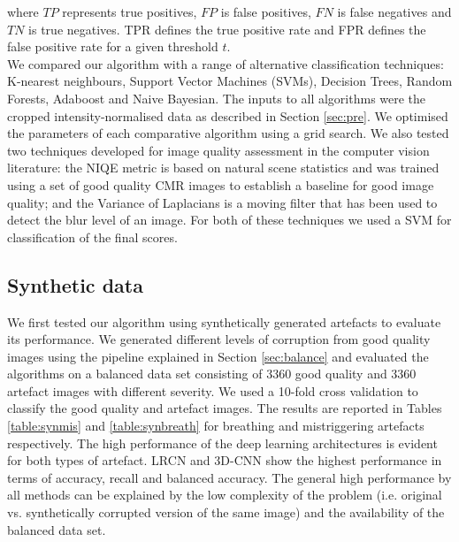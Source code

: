 \documentclass[preprint,12pt,authoryear]{elsarticle}
\begin{document}
where $TP$ represents true positives, $FP$ is false positives, $FN$ is false negatives and $TN$ is true negatives. TPR defines the true positive rate and FPR defines the false positive rate for a given threshold $t$.\\

We compared our algorithm with a range of alternative classification techniques: K-nearest neighbours, Support Vector Machines (SVMs), Decision Trees, Random Forests, Adaboost  and  Naive Bayesian. The inputs to all algorithms were the cropped intensity-normalised data as described in Section \ref{sec:pre}. We optimised the parameters of each comparative algorithm using a grid search. We also tested two techniques developed for image quality assessment in the computer vision literature: the NIQE metric \citep{Mittal2013} is based on natural scene statistics and was trained using a set of good quality CMR images to establish a baseline for good image quality; and the Variance of Laplacians is a moving filter that has been used to detect the blur level of an image. For both of these techniques we used a SVM for classification of the final scores.

\subsection{Synthetic data}
\label{sec:SyntheticResults}

We first tested our algorithm using synthetically generated artefacts to evaluate its performance. We generated different levels of corruption from good quality images using the pipeline explained in Section \ref{sec:balance} and evaluated the algorithms on a balanced data set consisting of 3360 good quality and 3360 artefact images with different severity. We used a  10-fold cross validation to classify the good quality and artefact images. The results are reported in Tables \ref{table:synmis} and \ref{table:synbreath}  for breathing and mistriggering artefacts respectively.  The high performance of the deep learning architectures is evident for both types of artefact.
LRCN and 3D-CNN show the highest performance in terms of accuracy, recall and balanced accuracy. The general high performance by all methods can be explained by the low complexity of the problem (i.e. original vs. synthetically corrupted version of the same image) and the availability of the balanced data set.
\end{document}
